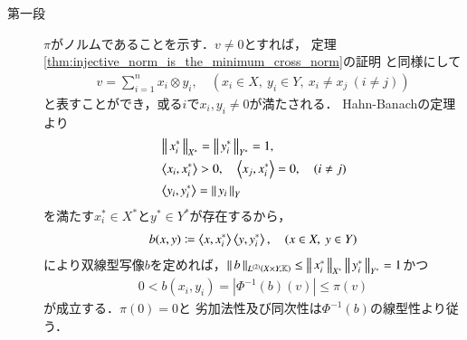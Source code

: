 	\begin{prf}\mbox{}
		\begin{description}
			\item[第一段]
				$\pi$がノルムであることを示す．$v \neq 0$とすれば，
				定理\ref{thm:injective_norm_is_the_minimum_cross_norm}の証明
				と同様にして
				\begin{align}
					v = \sum_{i=1}^n x_i \otimes y_i,
					\quad (x_i \in X,\ y_i \in Y,\ x_i \neq x_j\ (i \neq j))
				\end{align}
				と表すことができ，或る$i$で$x_i,y_i \neq 0$が満たされる．
				Hahn-Banachの定理より
				\begin{align}
					&\Norm{x_i^*}{X^*} = \Norm{y_i^*}{Y^*} = 1, \\
					&\inprod<x_i,x_i^*> > 0,
						\quad \inprod<x_j,x_i^*> = 0,\quad (i \neq j) \\
					&\inprod<y_i,y_i^*> = \Norm{y_i}{Y}
				\end{align}
				を満たす$x_i^* \in X^*$と$y^* \in Y^*$が存在するから，
				\begin{align}
					b(x,y) \coloneqq \inprod<x,x_i^*> \inprod<y,y_i^*>,
					\quad (x \in X,\ y \in Y)
				\end{align}
				により双線型写像$b$を定めれば，$\Norm{b}{\ContLn{X \times Y}{\K}{2}}
				\leq \Norm{x_i^*}{X^*} \Norm{y_i^*}{Y^*} = 1$かつ
				\begin{align}
					0 < b(x_i,y_i) = |\Phi^{-1}(b)(v)| \leq \pi(v)
				\end{align}
				が成立する．$\pi(0) = 0$と
				劣加法性及び同次性は$\Phi^{-1}(b)$の線型性より従う．
			

\end{description}
\end{prf}
